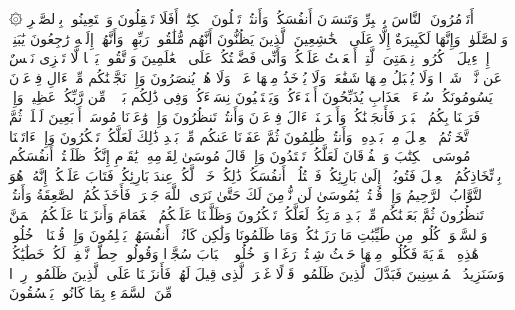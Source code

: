 \startbuffer[\q:2:44]
۞ أَتَأۡمُرُونَ ٱلنَّاسَ بِٱلۡبِرِّ وَتَنسَوۡنَ أَنفُسَكُمۡ وَأَنتُمۡ تَتۡلُونَ ٱلۡكِتَٰبَۚ أَفَلَا تَعۡقِلُونَ%
\stopbuffer
\startbuffer[\q:2:45]
وَٱسۡتَعِینُوا۟ بِٱلصَّبۡرِ وَٱلصَّلَوٰةِۚ وَإِنَّهَا لَكَبِیرَةٌ إِلَّا عَلَى ٱلۡخَٰشِعِینَ%
\stopbuffer
\startbuffer[\q:2:46]
ٱلَّذِینَ یَظُنُّونَ أَنَّهُم مُّلَٰقُوا۟ رَبِّهِمۡ وَأَنَّهُمۡ إِلَیۡهِ رَٰجِعُونَ%
\stopbuffer
\startbuffer[\q:2:47]
یَٰبَنِیۤ إِسۡرَٰۤءِیلَ ٱذۡكُرُوا۟ نِعۡمَتِیَ ٱلَّتِیۤ أَنۡعَمۡتُ عَلَیۡكُمۡ وَأَنِّی فَضَّلۡتُكُمۡ عَلَى ٱلۡعَٰلَمِینَ%
\stopbuffer
\startbuffer[\q:2:48]
وَٱتَّقُوا۟ یَوۡمࣰا لَّا تَجۡزِی نَفۡسٌ عَن نَّفۡسࣲ شَیۡءࣰا وَلَا یُقۡبَلُ مِنۡهَا شَفَٰعَةࣱ وَلَا یُؤۡخَذُ مِنۡهَا عَدۡلࣱ وَلَا هُمۡ یُنصَرُونَ%
\stopbuffer
\startbuffer[\q:2:49]
وَإِذۡ نَجَّیۡنَٰكُم مِّنۡ ءَالِ فِرۡعَوۡنَ یَسُومُونَكُمۡ سُوۤءَ ٱلۡعَذَابِ یُذَبِّحُونَ أَبۡنَاۤءَكُمۡ وَیَسۡتَحۡیُونَ نِسَاۤءَكُمۡۚ وَفِی ذَٰلِكُم بَلَاۤءࣱ مِّن رَّبِّكُمۡ عَظِیمࣱ%
\stopbuffer
\startbuffer[\q:2:50]
وَإِذۡ فَرَقۡنَا بِكُمُ ٱلۡبَحۡرَ فَأَنجَیۡنَٰكُمۡ وَأَغۡرَقۡنَاۤ ءَالَ فِرۡعَوۡنَ وَأَنتُمۡ تَنظُرُونَ%
\stopbuffer
\startbuffer[\q:2:51]
وَإِذۡ وَٰعَدۡنَا مُوسَىٰۤ أَرۡبَعِینَ لَیۡلَةࣰ ثُمَّ ٱتَّخَذۡتُمُ ٱلۡعِجۡلَ مِنۢ بَعۡدِهِۦ وَأَنتُمۡ ظَٰلِمُونَ%
\stopbuffer
\startbuffer[\q:2:52]
ثُمَّ عَفَوۡنَا عَنكُم مِّنۢ بَعۡدِ ذَٰلِكَ لَعَلَّكُمۡ تَشۡكُرُونَ%
\stopbuffer
\startbuffer[\q:2:53]
وَإِذۡ ءَاتَیۡنَا مُوسَى ٱلۡكِتَٰبَ وَٱلۡفُرۡقَانَ لَعَلَّكُمۡ تَهۡتَدُونَ%
\stopbuffer
\startbuffer[\q:2:54]
وَإِذۡ قَالَ مُوسَىٰ لِقَوۡمِهِۦ یَٰقَوۡمِ إِنَّكُمۡ ظَلَمۡتُمۡ أَنفُسَكُم بِٱتِّخَاذِكُمُ ٱلۡعِجۡلَ فَتُوبُوۤا۟ إِلَىٰ بَارِئِكُمۡ فَٱقۡتُلُوۤا۟ أَنفُسَكُمۡ ذَٰلِكُمۡ خَیۡرࣱ لَّكُمۡ عِندَ بَارِئِكُمۡ فَتَابَ عَلَیۡكُمۡۚ إِنَّهُۥ هُوَ ٱلتَّوَّابُ ٱلرَّحِیمُ%
\stopbuffer
\startbuffer[\q:2:55]
وَإِذۡ قُلۡتُمۡ یَٰمُوسَىٰ لَن نُّؤۡمِنَ لَكَ حَتَّىٰ نَرَى ٱللَّهَ جَهۡرَةࣰ فَأَخَذَتۡكُمُ ٱلصَّٰعِقَةُ وَأَنتُمۡ تَنظُرُونَ%
\stopbuffer
\startbuffer[\q:2:56]
ثُمَّ بَعَثۡنَٰكُم مِّنۢ بَعۡدِ مَوۡتِكُمۡ لَعَلَّكُمۡ تَشۡكُرُونَ%
\stopbuffer
\startbuffer[\q:2:57]
وَظَلَّلۡنَا عَلَیۡكُمُ ٱلۡغَمَامَ وَأَنزَلۡنَا عَلَیۡكُمُ ٱلۡمَنَّ وَٱلسَّلۡوَىٰۖ كُلُوا۟ مِن طَیِّبَٰتِ مَا رَزَقۡنَٰكُمۡۚ وَمَا ظَلَمُونَا وَلَٰكِن كَانُوۤا۟ أَنفُسَهُمۡ یَظۡلِمُونَ%
\stopbuffer
\startbuffer[\q:2:58]
وَإِذۡ قُلۡنَا ٱدۡخُلُوا۟ هَٰذِهِ ٱلۡقَرۡیَةَ فَكُلُوا۟ مِنۡهَا حَیۡثُ شِئۡتُمۡ رَغَدࣰا وَٱدۡخُلُوا۟ ٱلۡبَابَ سُجَّدࣰا وَقُولُوا۟ حِطَّةࣱ نَّغۡفِرۡ لَكُمۡ خَطَٰیَٰكُمۡۚ وَسَنَزِیدُ ٱلۡمُحۡسِنِینَ%
\stopbuffer
\startbuffer[\q:2:59]
فَبَدَّلَ ٱلَّذِینَ ظَلَمُوا۟ قَوۡلًا غَیۡرَ ٱلَّذِی قِیلَ لَهُمۡ فَأَنزَلۡنَا عَلَى ٱلَّذِینَ ظَلَمُوا۟ رِجۡزࣰا مِّنَ ٱلسَّمَاۤءِ بِمَا كَانُوا۟ یَفۡسُقُونَ%
